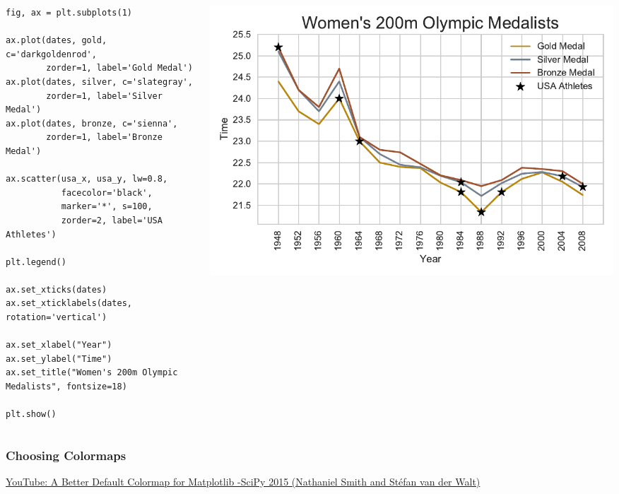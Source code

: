 \documentclass{beamer}
\begin{document}
\begin{frame}[fragile]
\tiny{
\begin{columns}
\begin{column}{0.45\textwidth}
\begin{verbatim}
fig, ax = plt.subplots(1)

ax.plot(dates, gold, c='darkgoldenrod',
        zorder=1, label='Gold Medal')
ax.plot(dates, silver, c='slategray',
        zorder=1, label='Silver Medal')
ax.plot(dates, bronze, c='sienna',
        zorder=1, label='Bronze Medal')

ax.scatter(usa_x, usa_y, lw=0.8,
           facecolor='black',
           marker='*', s=100,
           zorder=2, label='USA Athletes')

plt.legend()

ax.set_xticks(dates)
ax.set_xticklabels(dates, rotation='vertical')

ax.set_xlabel("Year")
ax.set_ylabel("Time")
ax.set_title("Women's 200m Olympic Medalists", fontsize=18)

plt.show()
\end{verbatim}
\end{column}
\begin{column}{0.55\textwidth}
\includegraphics[width=\textwidth]{../olympics_8.pdf}
\end{column}
\end{columns}
}
\end{frame}

\begin{frame}
\frametitle{Choosing Colormaps}
\begin{center}
\textcolor{orange}{
\href{https://www.youtube.com/watch?v=xAoljeRJ3lU}{YouTube: A Better Default Colormap for Matplotlib -\newline SciPy 2015 (Nathaniel Smith and Stéfan van der Walt)}
}
\end{center}
\end{frame}
\end{document}
